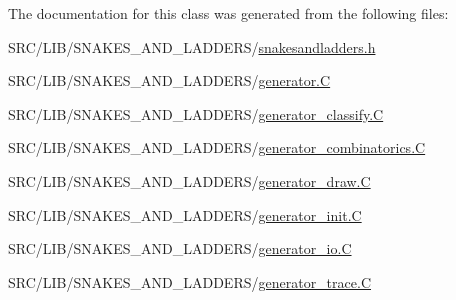 The documentation for this class was generated from the following files\+:\begin{DoxyCompactItemize}
\item 
S\+R\+C/\+L\+I\+B/\+S\+N\+A\+K\+E\+S\+\_\+\+A\+N\+D\+\_\+\+L\+A\+D\+D\+E\+R\+S/\mbox{\hyperlink{snakesandladders_8h}{snakesandladders.\+h}}\item 
S\+R\+C/\+L\+I\+B/\+S\+N\+A\+K\+E\+S\+\_\+\+A\+N\+D\+\_\+\+L\+A\+D\+D\+E\+R\+S/\mbox{\hyperlink{generator_8_c}{generator.\+C}}\item 
S\+R\+C/\+L\+I\+B/\+S\+N\+A\+K\+E\+S\+\_\+\+A\+N\+D\+\_\+\+L\+A\+D\+D\+E\+R\+S/\mbox{\hyperlink{generator__classify_8_c}{generator\+\_\+classify.\+C}}\item 
S\+R\+C/\+L\+I\+B/\+S\+N\+A\+K\+E\+S\+\_\+\+A\+N\+D\+\_\+\+L\+A\+D\+D\+E\+R\+S/\mbox{\hyperlink{generator__combinatorics_8_c}{generator\+\_\+combinatorics.\+C}}\item 
S\+R\+C/\+L\+I\+B/\+S\+N\+A\+K\+E\+S\+\_\+\+A\+N\+D\+\_\+\+L\+A\+D\+D\+E\+R\+S/\mbox{\hyperlink{generator__draw_8_c}{generator\+\_\+draw.\+C}}\item 
S\+R\+C/\+L\+I\+B/\+S\+N\+A\+K\+E\+S\+\_\+\+A\+N\+D\+\_\+\+L\+A\+D\+D\+E\+R\+S/\mbox{\hyperlink{generator__init_8_c}{generator\+\_\+init.\+C}}\item 
S\+R\+C/\+L\+I\+B/\+S\+N\+A\+K\+E\+S\+\_\+\+A\+N\+D\+\_\+\+L\+A\+D\+D\+E\+R\+S/\mbox{\hyperlink{generator__io_8_c}{generator\+\_\+io.\+C}}\item 
S\+R\+C/\+L\+I\+B/\+S\+N\+A\+K\+E\+S\+\_\+\+A\+N\+D\+\_\+\+L\+A\+D\+D\+E\+R\+S/\mbox{\hyperlink{generator__trace_8_c}{generator\+\_\+trace.\+C}}\end{DoxyCompactItemize}
